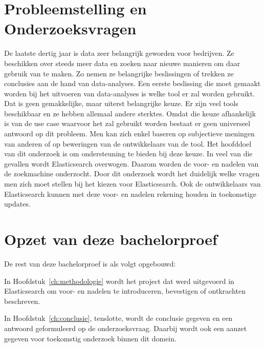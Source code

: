 \section{Probleemstelling en Onderzoeksvragen}
\label{sec:onderzoeksvragen}


De laatste dertig jaar is data zeer belangrijk geworden voor bedrijven. Ze beschikken over steeds meer data en zoeken naar nieuwe manieren om daar gebruik van te maken. Zo nemen ze belangrijke beslissingen of trekken ze conclusies aan de hand van data-analyses. Een eerste beslissing die moet gemaakt worden bij het uitvoeren van data-analyses is welke tool er zal worden gebruikt. Dat is geen gemakkelijke, maar uiterst belangrijke keuze. Er zijn veel tools beschikbaar en ze hebben allemaal andere sterktes. Omdat die keuze afhankelijk is van de use case waarvoor het zal gebruikt worden bestaat er geen universeel antwoord op dit probleem. Men kan zich enkel baseren op subjectieve meningen van anderen of op beweringen van de ontwikkelaars van de tool. Het hoofddoel van dit onderzoek is om ondersteuning te bieden bij deze keuze. In veel van die gevallen wordt Elasticsearch overwogen. Daarom worden de voor- en nadelen van de zoekmachine onderzocht. Door dit onderzoek wordt het duidelijk welke vragen men zich moet stellen bij het kiezen voor Elasticsearch. Ook de ontwikkelaars van Elasticsearch kunnen met deze voor- en nadelen rekening houden in toekomstige updates.

\section{Opzet van deze bachelorproef}
\label{sec:opzet-bachelorproef}


De rest van deze bachelorproef is als volgt opgebouwd:

In Hoofdstuk~\ref{ch:methodologie} wordt het project dat werd uitgevoerd in Elasticsearch om voor- en nadelen te introduceren, bevestigen of ontkrachten beschreven.

In Hoofdstuk~\ref{ch:conclusie}, tenslotte, wordt de conclusie gegeven en een antwoord geformuleerd op de onderzoeksvraag. Daarbij wordt ook een aanzet gegeven voor toekomstig onderzoek binnen dit domein.

